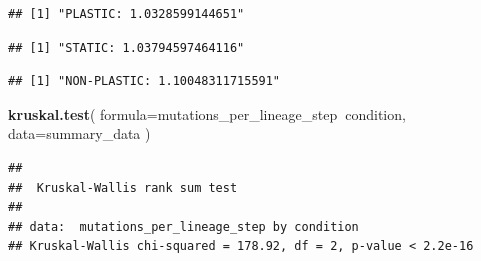 \documentclass[]{book}
\newenvironment{Shaded}{\begin{snugshade}}{\end{snugshade}}
\newcommand{\DataTypeTok}[1]{\textcolor[rgb]{0.13,0.29,0.53}{#1}}
\newcommand{\KeywordTok}[1]{\textcolor[rgb]{0.13,0.29,0.53}{\textbf{#1}}}
\newcommand{\NormalTok}[1]{#1}
\newcommand{\OperatorTok}[1]{\textcolor[rgb]{0.81,0.36,0.00}{\textbf{#1}}}
\newcommand{\StringTok}[1]{\textcolor[rgb]{0.31,0.60,0.02}{#1}}
\begin{document}
\begin{verbatim}
## [1] "PLASTIC: 1.0328599144651"
\end{verbatim}

\begin{Shaded}
\end{Shaded}

\begin{verbatim}
## [1] "STATIC: 1.03794597464116"
\end{verbatim}

\begin{Shaded}
\end{Shaded}

\begin{verbatim}
## [1] "NON-PLASTIC: 1.10048311715591"
\end{verbatim}

\begin{Shaded}
\begin{Highlighting}[]
\KeywordTok{kruskal.test}\NormalTok{(}
  \DataTypeTok{formula=}\NormalTok{mutations_per_lineage_step}\OperatorTok{~}\NormalTok{condition,}
  \DataTypeTok{data=}\NormalTok{summary_data}
\NormalTok{)}
\end{Highlighting}
\end{Shaded}

\begin{verbatim}
## 
##  Kruskal-Wallis rank sum test
## 
## data:  mutations_per_lineage_step by condition
## Kruskal-Wallis chi-squared = 178.92, df = 2, p-value < 2.2e-16
\end{verbatim}

\begin{Shaded}
\end{Shaded}
\end{document}
